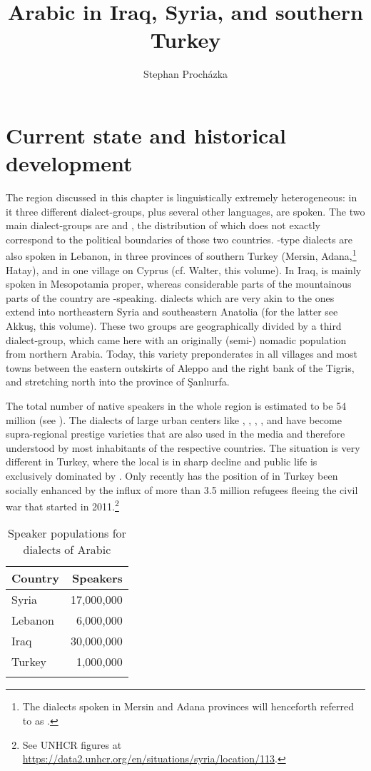 \documentclass[output=paper]{langsci/langscibook}
\author{Stephan Procházka\affiliation{University of Vienna}}
\title{Arabic in Iraq, Syria, and southern Turkey}
\begin{document}
\section{Current state and historical development}  \label{state} 

The region discussed in this chapter is linguistically extremely heterogeneous: in it three different  dialect-groups, plus several other languages, are spoken. The two main  dialect-groups are  and , the distribution of which does not exactly correspond to the political boundaries of those two countries. -type dialects are also spoken in Lebanon, in three provinces of southern Turkey (Mersin, Adana,\footnote{The dialects spoken in Mersin and Adana provinces will henceforth referred to as  .} Hatay), and in one village on {Cyprus} (cf. Walter, this volume). In Iraq,  is mainly spoken in Mesopotamia proper, whereas considerable parts of the mountainous parts of the country are -speaking.  dialects which are very akin to the  ones extend into northeastern Syria and southeastern {Anatolia} (for the latter see Akkuş, this volume). These two groups are geographically divided by a third dialect-group, which came here with an originally (semi-) nomadic population from northern Arabia. Today, this variety preponderates in all villages and most towns between the eastern outskirts of Aleppo and the right bank of the Tigris, and stretching north into the  province of Şanlıurfa. 

The total number of native  speakers in the whole region is estimated to be 54 million (see ). The dialects of large urban centers like , , , , and  have become supra-regional {prestige} varieties that are also used in the media and therefore understood by most inhabitants of the respective countries. The situation is very different in Turkey, where the local  is in sharp decline and public life is exclusively dominated by . Only recently has the position of  in Turkey been socially enhanced by the influx of more than 3.5 million  refugees fleeing the civil war that started in 2011.\footnote{See UNHCR figures at \url{https://data2.unhcr.org/en/situations/syria/location/113}.}

\begin{table}
\begin{tabularx}{.50\textwidth}{Xr}
\lsptoprule
Country & Speakers\\
\midrule
{Syria} &  17,000,000\\
{Lebanon} & 6,000,000\\
{Iraq} &  30,000,000\\
Turkey &  1,000,000\\
\lspbottomrule
\end{tabularx} 
\caption{Speaker populations for dialects of Arabic}
\label{tab:prochazka:1}
\end{table}
\end{document}
